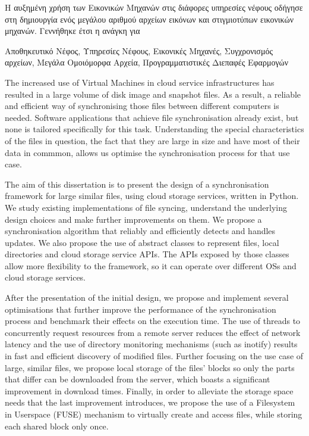 \onehalfspacing
\begin{abstractgr}
  Η αυξημένη χρήση των Εικονικών Μηχανών στις διάφορες υπηρεσίες νέφους οδήγησε στη δημιουργία ενός μεγάλου αριθμού αρχείων εικόνων και στιγμιοτύπων εικονικών μηχανών. Γεννήθηκε έτσι η ανάγκη για
\begin{keywordsgr}
    Αποθηκευτικό Νέφος, Υπηρεσίες Νέφους, Εικονικές Μηχανές, Συγχρονισμός αρχείων, Μεγάλα Ομοιόμορφα Αρχεία, Προγραμματιστικές Διεπαφές Εφαρμογών
\end{keywordsgr}
\end{abstractgr}


\begin{abstracten}
  The increased use of Virtual Machines in cloud service infrastructures has resulted in a large volume of disk image and snapshot files. As a result, a reliable and efficient way of synchronising those files between different computers is needed. Software applications that achieve file synchronisation already exist, but none is tailored specifically for this task. Understanding the special characteristics of the files in question, the fact that they are large in size and have most of their data in commmon, allows us optimise the synchronisation process for that use case.

  The aim of this dissertation is to present the design of a synchronisation framework for large similar files, using cloud storage services, written in Python. We study existing implementations of file syncing, understand the underlying design choices and make further improvements on them. We propose a synchronisation algorithm that reliably and efficiently detects and handles updates. We also propose the use of abstract classes to represent files, local directories and cloud storage service APIs. The APIs exposed by those classes allow more flexibility to the framework, so it can operate over different OSs and cloud storage services.

  After the presentation of the initial design, we propose and implement several optimisations that further improve the performance of the synchronisation process and benchmark their effects on the execution time. The use of threads to concurrently request resources from a remote server reduces the effect of network latency and the use of directory monitoring mechanisms (such as inotify) results in fast and efficient discovery of modified files. Further focusing on the use case of large, similar files, we propose local storage of the files' blocks so only the parts that differ can be downloaded from the server, which boasts a significant improvement in download times. Finally, in order to alleviate the storage space needs that the last improvement introduces, we propose the use of a Filesystem in Userspace (FUSE) mechanism to virtually create and access files, while storing each shared block only once.


\end{abstracten}
